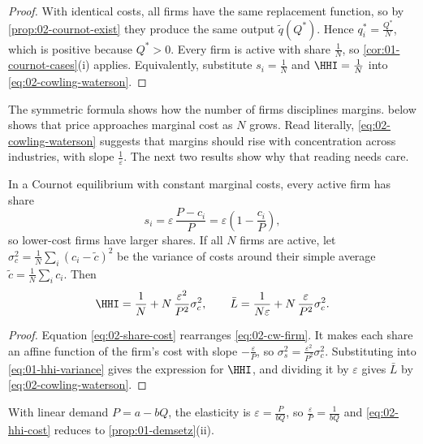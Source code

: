 \begin{proof}
With identical costs, all firms have the same replacement function, so by \cref{prop:02-cournot-exist} they produce
the same output $\tilde q(Q^*)$. Hence $q_i^* = \frac{Q^*}{N}$, which is positive because $Q^* > 0$. Every firm is
active with share $\frac{1}{N}$, so \cref{cor:01-cournot-cases}(i) applies. Equivalently, substitute
$s_i = \frac{1}{N}$ and $\HHI = \frac{1}{N}$ into \eqref{eq:02-cowling-waterson}.
\end{proof}

The symmetric formula shows how the number of firms disciplines margins.  below shows
that price approaches marginal cost as $N$ grows. Read literally, \eqref{eq:02-cowling-waterson} suggests that
margins should rise with concentration across industries, with slope $\frac{1}{\varepsilon}$. The next two results
show why that reading needs care.

\begin{corollary}\label{cor:02-efficient}
In a Cournot equilibrium with constant marginal costs, every active firm has share
\begin{equation}\label{eq:02-share-cost}
  s_i = \varepsilon\,\frac{P - c_i}{P} = \varepsilon\left(1 - \frac{c_i}{P}\right),
\end{equation}
so lower-cost firms have larger shares. If all $N$ firms are active, let $\sigma_c^2 = \frac{1}{N}\sum_i (c_i -
\tilde c)^2$ be the variance of costs around their simple average $\tilde c = \frac{1}{N}\sum_i c_i$. Then
\begin{equation}\label{eq:02-hhi-cost}
  \HHI = \frac{1}{N} + N\,\frac{\varepsilon^2}{P^2}\sigma_c^2, \qquad
  \bar L = \frac{1}{N\varepsilon} + N\,\frac{\varepsilon}{P^2}\sigma_c^2 .
\end{equation}
\end{corollary}

\begin{proof}
Equation \eqref{eq:02-share-cost} rearranges \eqref{eq:02-cw-firm}. It makes each share an affine function of the
firm's cost with slope $-\frac{\varepsilon}{P}$, so $\sigma_s^2 = \frac{\varepsilon^2}{P^2}\sigma_c^2$.
Substituting into \eqref{eq:01-hhi-variance} gives the expression for $\HHI$, and dividing it by $\varepsilon$ gives
$\bar L$ by \eqref{eq:02-cowling-waterson}.
\end{proof}

With linear demand $P = a - bQ$, the elasticity is $\varepsilon = \frac{P}{bQ}$, so $\frac{\varepsilon}{P} =
\frac{1}{bQ}$ and \eqref{eq:02-hhi-cost} reduces to \cref{prop:01-demsetz}(ii).

